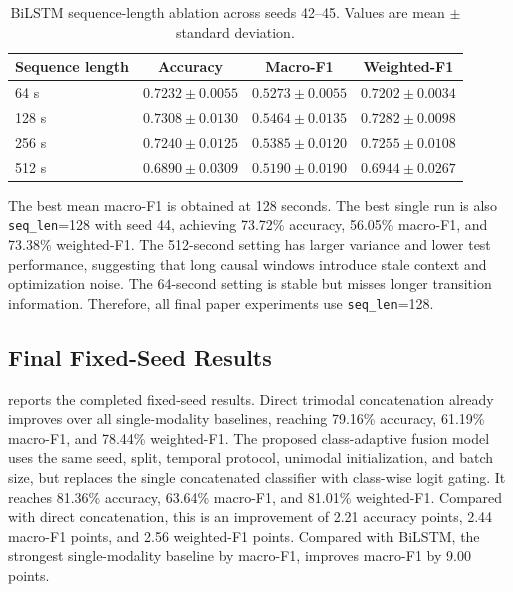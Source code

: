 \begin{table}[t]
\centering
\caption{BiLSTM sequence-length ablation across seeds 42--45. Values are mean $\pm$ standard deviation.}
\label{tab:seq_len}
\small
\begin{tabular}{lccc}
\toprule
\textbf{Sequence length} & \textbf{Accuracy} & \textbf{Macro-F1} & \textbf{Weighted-F1} \\
\midrule
64 s  & $0.7232 \pm 0.0055$ & $0.5273 \pm 0.0055$ & $0.7202 \pm 0.0034$ \\
128 s & $\mathbf{0.7308 \pm 0.0130}$ & $\mathbf{0.5464 \pm 0.0135}$ & $\mathbf{0.7282 \pm 0.0098}$ \\
256 s & $0.7240 \pm 0.0125$ & $0.5385 \pm 0.0120$ & $0.7255 \pm 0.0108$ \\
512 s & $0.6890 \pm 0.0309$ & $0.5190 \pm 0.0190$ & $0.6944 \pm 0.0267$ \\
\bottomrule
\end{tabular}
\end{table}

The best mean macro-F1 is obtained at 128 seconds. The best single run is also \texttt{seq\_len}=128 with seed 44, achieving 73.72\% accuracy, 56.05\% macro-F1, and 73.38\% weighted-F1. The 512-second setting has larger variance and lower test performance, suggesting that long causal windows introduce stale context and optimization noise. The 64-second setting is stable but misses longer transition information. Therefore, all final paper experiments use \texttt{seq\_len}=128.

\subsection{Final Fixed-Seed Results}
\label{sec:final_results}

 reports the completed fixed-seed results. Direct trimodal concatenation already improves over all single-modality baselines, reaching 79.16\% accuracy, 61.19\% macro-F1, and 78.44\% weighted-F1. The proposed class-adaptive fusion model uses the same seed, split, temporal protocol, unimodal initialization, and batch size, but replaces the single concatenated classifier with class-wise logit gating. It reaches 81.36\% accuracy, 63.64\% macro-F1, and 81.01\% weighted-F1. Compared with direct concatenation, this is an improvement of 2.21 accuracy points, 2.44 macro-F1 points, and 2.56 weighted-F1 points. Compared with BiLSTM, the strongest single-modality baseline by macro-F1, \ours{} improves macro-F1 by 9.00 points.

